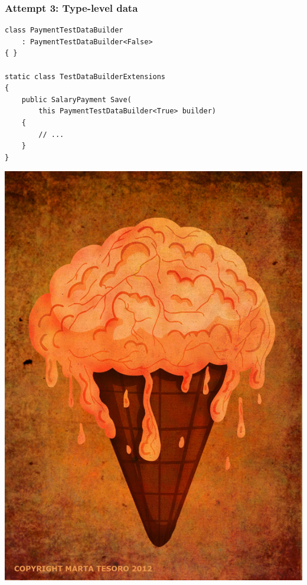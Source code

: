 \documentclass{beamer}
\begin{document}
  \begin{frame}[fragile]
    \frametitle{Attempt 3: Type-level data}
    \begin{verbatim}
class PaymentTestDataBuilder
    : PaymentTestDataBuilder<False>
{ }

static class TestDataBuilderExtensions
{
    public SalaryPayment Save(
        this PaymentTestDataBuilder<True> builder)
    {
        // ...
    }
}
    \end{verbatim}
\end{frame}

  \begin{frame}
    \centering
    \includegraphics[scale=0.3]{brain_melt_2.jpg}
  \end{frame}
\end{document}
